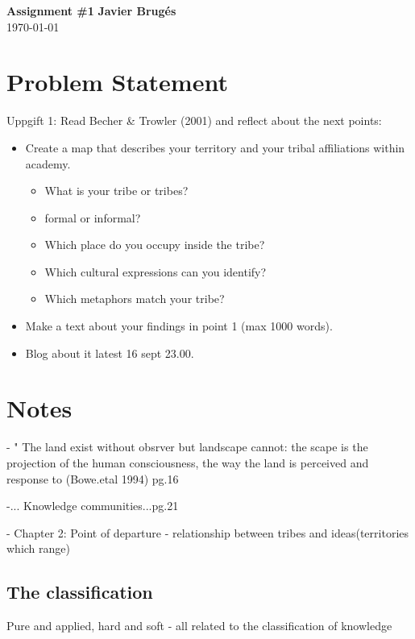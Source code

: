 \documentclass[a4paper, 11pt]{article}
\begin{document}
\noindent
\large\textbf{Assignment \#1} \hfill \textbf{Javier Brug\'{e}s} \\
\today\\

\section*{Problem Statement}
Uppgift 1: Read Becher \& Trowler (2001) and reflect about the next points:

\begin{itemize}
	\item Create a map that describes your territory and your tribal affiliations within academy.
	\begin{itemize}
		\item What is your tribe or tribes?
		\item formal or informal?
		\item Which place do you occupy inside the tribe?
		\item Which cultural expressions can you identify?
		\item Which metaphors match your tribe?
	\end{itemize}
	\item Make a text about your findings in point 1 (max 1000 words).
	\item Blog about it latest 16 sept 23.00.
\end{itemize}


\section*{Notes}
- " The land exist without obsrver but landscape cannot: the scape is the projection of the human consciousness, the way the land is perceived and response to (Bowe.etal 1994) pg.16

-... Knowledge communities...pg.21

- Chapter 2: Point of departure
	- relationship between tribes and ideas(territories which range)
	
	\subsection*{The classification}
	Pure and applied, hard and soft - all related to the classification of knowledge
\end{document}
